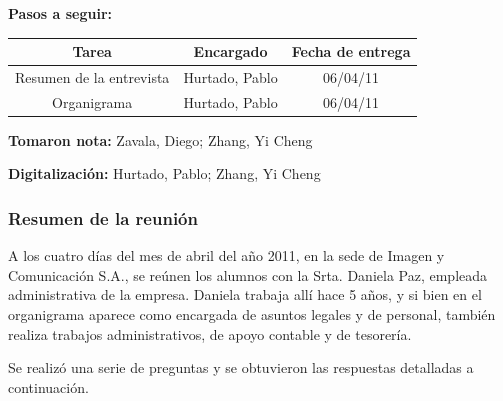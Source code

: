 \documentclass[a4paper,10pt,titlepage]{article}
\begin{document}
\vspace{6cm}
\textbf{Pasos a seguir:}\\
\begin{center}
\begin{tabular}{|c|c|c|}
	\hline \textbf{Tarea} & \textbf{Encargado} & \textbf{Fecha de entrega} \\ 
	\hline Resumen de la entrevista & Hurtado, Pablo & 06/04/11 \\ 
	\hline Organigrama & Hurtado, Pablo & 06/04/11 \\ 
	\hline 
\end{tabular}
\end{center}

\textbf{Tomaron nota:} Zavala, Diego; Zhang, Yi Cheng

\textbf{Digitalizaci\'on:} Hurtado, Pablo; Zhang, Yi Cheng



\newpage

\subsubsection*{Resumen de la reuni\'on}
A los cuatro d\'ias del mes de abril del a\~no 2011, en la sede de Imagen y Comunicaci\'on S.A., se re\'unen los alumnos con la Srta. Daniela Paz, empleada administrativa de la empresa.
Daniela trabaja all\'i hace 5 a\~nos, y si bien en el organigrama aparece como encargada de asuntos legales y de personal, tambi\'en realiza trabajos administrativos, de apoyo contable y de tesorer\'ia.

Se realiz\'o una serie de preguntas y se obtuvieron las respuestas detalladas a continuaci\'on.
\end{document}
